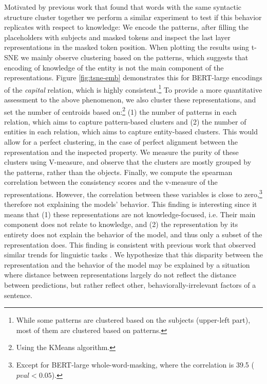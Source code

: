 Motivated by previous work that found that words with the same syntactic structure cluster together \cite{chi-etal-2020-finding,ravfogel-etal-2020-unsupervised} we perform a similar experiment to test if this behavior replicates with respect to knowledge:
We encode the patterns, after filling the placeholders with subjects and masked tokens and inspect the last layer representations in the masked token position.
When plotting the results using t-SNE \cite{tsne} we mainly
observe clustering based on the patterns, which suggests
that encoding of knowledge of the entity is not the main component of the representations.
Figure \ref{fig:tsne-emb} demonstrates
this for BERT-large encodings of the \textit{capital} relation, which is highly consistent.\footnote{While some patterns are clustered based on the subjects (upper-left part), most of them are clustered based on patterns.}
To provide a more quantitative assessment to the above phenomenon, 
we also cluster these representations, and set the number of centroids based on:\footnote{Using the KMeans algorithm.} (1) the number of patterns in each relation, which aims to capture pattern-based clusters and (2) the number of entities in each relation, which aims to capture entity-based clusters. This would allow for a perfect clustering, in the case of perfect alignment between the representation and the inspected property.
We measure the purity of these clusters using V-measure, and observe that the clusters are mostly grouped by the patterns, rather than the objects.
Finally, we compute the spearman correlation between the consistency scores and the v-measure of the representations.
However, the correlation between these variables is close to zero,\footnote{Except for BERT-large whole-word-masking, where the correlation is 39.5 ($pval<0.05$).} therefore not explaining the models' behavior.
This finding is interesting since it means that (1) these representations are not knowledge-focused, i.e. Their main component does not relate to knowledge, and (2) the representation by its entirety does not explain the behavior of the model, and thus only a subset of the representation does. This finding is consistent with previous work that observed similar trends for linguistic tasks \cite{amnesic_probing}.
We hypothesize that this disparity between the representation and the behavior of the model may be explained by a situation where distance between representations largely do not reflect the distance between predictions, but rather reflect other, behaviorally-irrelevant factors of a sentence.


